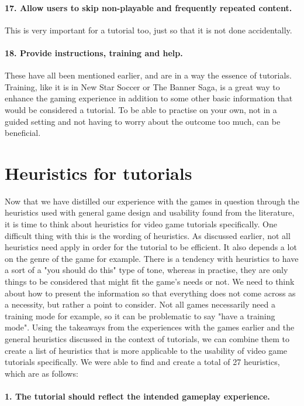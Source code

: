 \paragraph{17. Allow users to skip non-playable and frequently repeated content.} This is very important for a tutorial too, just so that it is not done accidentally.

\paragraph{18. Provide instructions, training and help.} These have all been mentioned earlier, and are in a way the essence of tutorials. Training, like it is in New Star Soccer or The Banner Saga, is a great way to enhance the gaming experience in addition to some other basic information that would be considered a tutorial. To be able to practise on your own, not in a guided setting and not having to worry about the outcome too much, can be beneficial.

\section{Heuristics for tutorials}
Now that we have distilled our experience with the games in question through the heuristics used with general game design and usability found from the literature, it is time to think about heuristics for video game tutorials specifically. One difficult thing with this is the wording of heuristics. As discussed earlier, not all heuristics need apply in order for the tutorial to be efficient. It also depends a lot on the genre of the game for example. There is a tendency with heuristics to have a sort of a "you should do this" type of tone, whereas in practise, they are only things to be considered that might fit the game's needs or not. We need to think about how to present the information so that everything does not come across as a necessity, but rather a point to consider. Not all games necessarily need a training mode for example, so it can be problematic to say "have a training mode". Using the takeaways from the experiences with the games earlier and the general heuristics discussed in the context of tutorials, we can combine them to create a list of heuristics that is more applicable to the usability of video game tutorials specifically. We were able to find and create a total of 27 heuristics, which are as follows:

\paragraph{1. The tutorial should reflect the intended gameplay experience.} 
